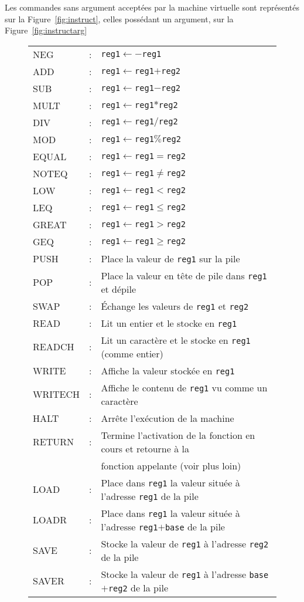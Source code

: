 \documentclass[12pt,a4]{article}
\begin{document}
Les commandes sans argument acceptées par la machine virtuelle sont
représentés sur la Figure~\ref{fig:instruct}, celles possédant un
argument, sur la Figure~\ref{fig:instructarg}

\begin{figure}
  \centering
  \begin{tabular}{lll}
    NEG   &:& {\tt reg1}$\leftarrow-${\tt reg1}\\
    ADD   &:& {\tt reg1}$\leftarrow${\tt reg1}$+${\tt reg2}\\
    SUB   &:& {\tt reg1}$\leftarrow${\tt reg1}$-${\tt reg2}\\
    MULT  &:& {\tt reg1}$\leftarrow${\tt reg1}$*${\tt reg2}\\
    DIV   &:& {\tt reg1}$\leftarrow${\tt reg1}$/${\tt reg2}\\
    MOD   &:& {\tt reg1}$\leftarrow${\tt reg1}$\%${\tt reg2}\\
    EQUAL &:& {\tt reg1}$\leftarrow${\tt reg1}$=${\tt reg2}\\
    NOTEQ &:& {\tt reg1}$\leftarrow${\tt reg1}$\neq${\tt reg2}\\
    LOW   &:& {\tt reg1}$\leftarrow${\tt reg1}$<${\tt reg2}\\
    LEQ   &:& {\tt reg1}$\leftarrow${\tt reg1}$\leqslant${\tt reg2}\\
    GREAT &:& {\tt reg1}$\leftarrow${\tt reg1}$>${\tt reg2}\\
    GEQ   &:& {\tt reg1}$\leftarrow${\tt reg1}$\geqslant${\tt reg2}\\
    PUSH  &:& Place la valeur de {\tt reg1} sur la pile\\
    POP   &:& Place la valeur en tête de pile dans {\tt reg1} et dépile\\
    SWAP  &:& Échange les valeurs de {\tt reg1} et {\tt reg2}\\
    READ  &:& Lit un entier et le stocke en {\tt reg1}\\
    READCH  &:& Lit un caractère et le stocke en {\tt reg1} (comme entier)\\
    WRITE &:& Affiche la valeur stockée en {\tt reg1}\\
    WRITECH &:& Affiche le contenu de {\tt reg1} vu comme un caractère\\
    HALT  &:& Arrête l'exécution de la machine\\
    RETURN&:& Termine l'activation de la fonction en cours
    et retourne à la\\&& fonction appelante (voir plus loin)\\
    LOAD &:& Place dans {\tt reg1} la valeur située à l'adresse {\tt reg1}
    de la pile\\
    LOADR &:& Place dans {\tt reg1} la valeur située à l'adresse
    {\tt reg1}$+${\tt base} de la pile\\
    SAVE &:& Stocke la valeur de {\tt reg1} à l'adresse {\tt reg2} de la pile\\
    SAVER&:& Stocke la valeur de {\tt reg1} à l'adresse {\tt base}$+${\tt reg2} de la pile\\
  \end{tabular}
  

\end{figure}
\end{document}
